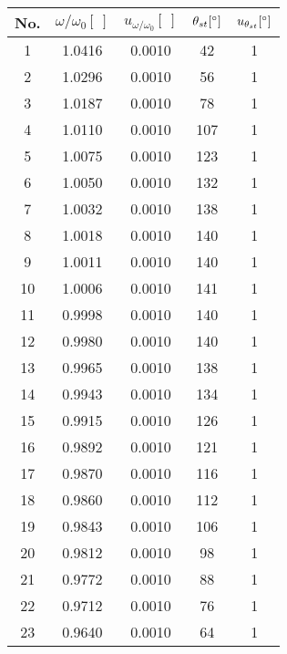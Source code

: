     \begin{figure}[H]
    \centering
    \begin{minipage}{0.4\textwidth}
        \begin{table}[H]
        \centering
            \begin{tabular}{|c|c|c|c|c|}
                \hline
                No. & $\omega/\omega_0[\ ]$ & $u_{\omega/\omega_0}[\ ]$ & $\theta_{st}[^\circ]$ & $u_{\theta_{st}}[^\circ]$\\\hline
                1 & 1.0416 & 0.0010 & 42 & 1\\\hline
                2 & 1.0296 & 0.0010 & 56 & 1\\\hline
                3 & 1.0187 & 0.0010 & 78 & 1\\\hline
                4 & 1.0110 & 0.0010 & 107 & 1\\\hline
                5 & 1.0075 & 0.0010 & 123 & 1\\\hline
                6 & 1.0050 & 0.0010 & 132 & 1\\\hline
                7 & 1.0032 & 0.0010 & 138 & 1\\\hline
                8 & 1.0018 & 0.0010 & 140 & 1\\\hline
                9 & 1.0011 & 0.0010 & 140 & 1\\\hline
                10 & 1.0006 & 0.0010 & 141 & 1\\\hline
                11 & 0.9998 & 0.0010 & 140 & 1\\\hline
                12 & 0.9980 & 0.0010 & 140 & 1\\\hline
                13 & 0.9965 & 0.0010 & 138 & 1\\\hline
                14 & 0.9943 & 0.0010 & 134 & 1\\\hline
                15 & 0.9915 & 0.0010 & 126 & 1\\\hline
                16 & 0.9892 & 0.0010 & 121 & 1\\\hline
                17 & 0.9870 & 0.0010 & 116 & 1\\\hline
                18 & 0.9860 & 0.0010 & 112 & 1\\\hline
                19 & 0.9843 & 0.0010 & 106 & 1\\\hline
                20 & 0.9812 & 0.0010 & 98 & 1\\\hline
                21 & 0.9772 & 0.0010 & 88 & 1\\\hline
                22 & 0.9712 & 0.0010 & 76 & 1\\\hline
                23 & 0.9640 & 0.0010 & 64 & 1\\\hline

\end{tabular}
\end{table}
\end{minipage}
\end{figure}
